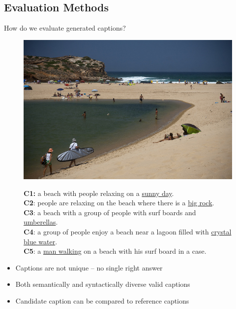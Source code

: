 \documentclass{beamer}
\begin{document}
\subsection{Evaluation Methods}
\begin{frame}{How do we evaluate generated captions?}
\begin{figure}[t]
    \begin{minipage}[c]{0.45\linewidth}
            \includegraphics[width=\textwidth]{images/COCO_train2014_000000440903.jpg}
    \end{minipage}\hfill
    \begin{minipage}[c]{0.52\linewidth}
            \textbf{C1:} a beach with people relaxing on a \underline{sunny day}. \\
            \textbf{C2}: people are relaxing on the beach where there is a \underline{big rock}. \\
            \textbf{C3}: a beach with a group of people with surf boards and \underline{umberellas}. \\
            \textbf{C4}: a group of people enjoy a beach near a lagoon filled with \underline{crystal blue
            water}. \\
            \textbf{C5}: a \underline{man walking} on a beach with his surf board in a case. \\
    \end{minipage}
  \vspace*{-3mm}
\end{figure}
    \begin{itemize}
        \item Captions are not unique -- no single right answer
        \item Both semantically and syntactically diverse valid captions
        \item Candidate caption can be compared to reference captions 
    \end{itemize}
\end{frame}
\end{document}
